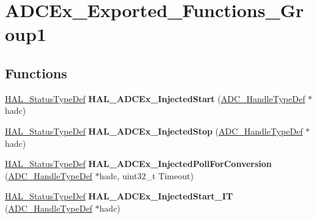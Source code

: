 \hypertarget{group___a_d_c_ex___exported___functions___group1}{}\section{A\+D\+C\+Ex\+\_\+\+Exported\+\_\+\+Functions\+\_\+\+Group1}
\label{group___a_d_c_ex___exported___functions___group1}
\subsection*{Functions}
\begin{DoxyCompactItemize}
\item 
\mbox{\label{group___a_d_c_ex___exported___functions___group1_gaa666882ff772df8a5140090422825ed6}} 
\mbox{\hyperlink{stm32f7xx__hal__def_8h_a63c0679d1cb8b8c684fbb0632743478f}{H\+A\+L\+\_\+\+Status\+Type\+Def}} {\bfseries H\+A\+L\+\_\+\+A\+D\+C\+Ex\+\_\+\+Injected\+Start} (\mbox{\hyperlink{struct_a_d_c___handle_type_def}{A\+D\+C\+\_\+\+Handle\+Type\+Def}} $\ast$hadc)
\item 
\mbox{\label{group___a_d_c_ex___exported___functions___group1_ga91f6c85ae910e9baaf578a346c30c7c1}} 
\mbox{\hyperlink{stm32f7xx__hal__def_8h_a63c0679d1cb8b8c684fbb0632743478f}{H\+A\+L\+\_\+\+Status\+Type\+Def}} {\bfseries H\+A\+L\+\_\+\+A\+D\+C\+Ex\+\_\+\+Injected\+Stop} (\mbox{\hyperlink{struct_a_d_c___handle_type_def}{A\+D\+C\+\_\+\+Handle\+Type\+Def}} $\ast$hadc)
\item 
\mbox{\label{group___a_d_c_ex___exported___functions___group1_ga5e11b306be79f36c71a73f2e465ad613}} 
\mbox{\hyperlink{stm32f7xx__hal__def_8h_a63c0679d1cb8b8c684fbb0632743478f}{H\+A\+L\+\_\+\+Status\+Type\+Def}} {\bfseries H\+A\+L\+\_\+\+A\+D\+C\+Ex\+\_\+\+Injected\+Poll\+For\+Conversion} (\mbox{\hyperlink{struct_a_d_c___handle_type_def}{A\+D\+C\+\_\+\+Handle\+Type\+Def}} $\ast$hadc, uint32\+\_\+t Timeout)
\item 
\mbox{\label{group___a_d_c_ex___exported___functions___group1_gaf55cd28b1394a0564f99e1f5069c0ed1}} 
\mbox{\hyperlink{stm32f7xx__hal__def_8h_a63c0679d1cb8b8c684fbb0632743478f}{H\+A\+L\+\_\+\+Status\+Type\+Def}} {\bfseries H\+A\+L\+\_\+\+A\+D\+C\+Ex\+\_\+\+Injected\+Start\+\_\+\+IT} (\mbox{\hyperlink{struct_a_d_c___handle_type_def}{A\+D\+C\+\_\+\+Handle\+Type\+Def}} $\ast$hadc)

\end{DoxyCompactItemize}
